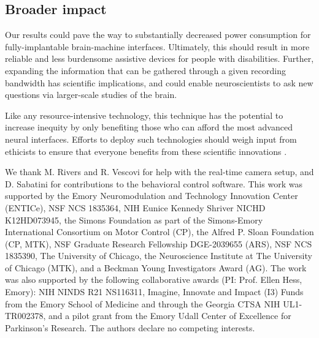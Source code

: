 \documentclass{article}
\begin{document}
\subsection{Broader impact}

Our results could pave the way to substantially decreased power consumption for fully-implantable brain-machine interfaces. Ultimately, this should result in more reliable and less burdensome assistive devices for people with disabilities. Further, expanding the information that can be gathered through a given recording bandwidth has scientific implications, and could enable neuroscientists to ask new questions via larger-scale studies of the brain.

Like any resource-intensive technology, this technique has the potential to increase inequity by only benefiting those who can afford the most advanced neural interfaces. Efforts to deploy such technologies should weigh input from ethicists to ensure that everyone benefits from these scientific innovations \cite{klein2015engineering,goering2021recommendations}.


\begin{ack}
We thank M. Rivers and R. Vescovi for help with the real-time camera setup, and D. Sabatini for contributions to the behavioral control software. This work was supported by the Emory Neuromodulation and Technology Innovation Center (ENTICe), NSF NCS 1835364, NIH Eunice Kennedy Shriver NICHD K12HD073945, the Simons Foundation as part of the Simons-Emory International Consortium on Motor Control (CP), the Alfred P. Sloan Foundation (CP, MTK), NSF Graduate Research Fellowship DGE-2039655 (ARS), NSF NCS 1835390, The University of Chicago, the Neuroscience Institute at The University of Chicago (MTK), and a Beckman Young Investigators Award (AG). The work was also supported by the following collaborative awards (PI: Prof. Ellen Hess, Emory): NIH NINDS R21 NS116311, Imagine, Innovate and Impact (I3) Funds from the Emory School of Medicine and through the Georgia CTSA NIH UL1-TR002378, and a pilot grant from the Emory Udall Center of Excellence for Parkinson’s Research. The authors declare no competing interests.
\end{ack}

\newpage


\end{document}
